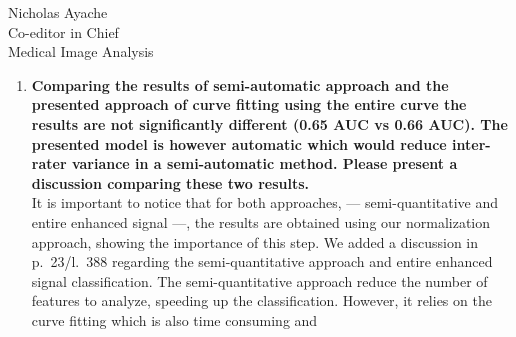 \documentclass{letter}
\begin{document}
\begin{letter}{Nicholas Ayache \\ Co-editor in Chief \\ Medical Image Analysis}
\begin{enumerate}
{      detection in DCE-MRI impacts the current clinical CAD
      pipeline. According to PIRADS v2 guidelines more emphasis is
      laid upon T1w, T2w and DWI compared to DCE images. Experienced
      radiologists can detect prostate cancers in peripheral zone with
      a high degree of accuracy (higher than 0.6 AUC). The transition
      zone lesions are more difficult to distinguish. Please comment
      how the model performs in detection of transition zone
      lesions. Further please comment how this model adds value to
      already established clinical pipeline of detecting prostate
      cancer (PIRADS).}\\
    A stratified analysis separating PZ and CG showed an increase of
    the classification performance in CG after applying our
    normalization method as depicted in Fig.\,8 p.~22.
    The PIRADS v2 emphasized that DCE-MRI have to be included in
    mp-MRI acquisition to detect small lesion. However, it also warn
    that the benefit is modest. Therefore, the impact of an
    improvement of detection in DCE-MRI can only be evaluated in a
    fully mp-MRI CAD system. Indeed, we recently showed, --- Lemaitre,
    Guillaume. Computer-Aided Diagnosis for Prostate Cancer using
    Multi-Parametric Magnetic Resonance Imaging. Diss. Universit\'e de
    Bourgogne; Universitat de Girona, 2016;
    Chapt.\,6/p.~150/Table~6.10 ---, that DCE-MRI features are
    considered important and the combination with other modalities
    will lead to better classification results.
    However, in our humble opinion, including those additional results
    will clutter the paper.
  \item \textbf{Comparing the results of semi-automatic approach and
      the presented approach of curve fitting using the entire curve
      the results are not significantly different (0.65 AUC vs 0.66
      AUC). The presented model is however automatic which would
      reduce inter-rater variance in a semi-automatic method. Please
      present a discussion comparing these two results.}\\
    It is important to notice that for both approaches, ---
    semi-quantitative and entire enhanced signal ---, the results
    are obtained using our normalization approach, showing the importance of
    this step. We added a discussion in p.~23/l.~388 regarding the
    semi-quantitative approach and entire enhanced signal
    classification. The semi-quantitative approach reduce the number
    of features to analyze, speeding up the classification. However,
    it relies on the curve fitting which is also time consuming and

\end{enumerate}
\end{letter}
\end{document}
